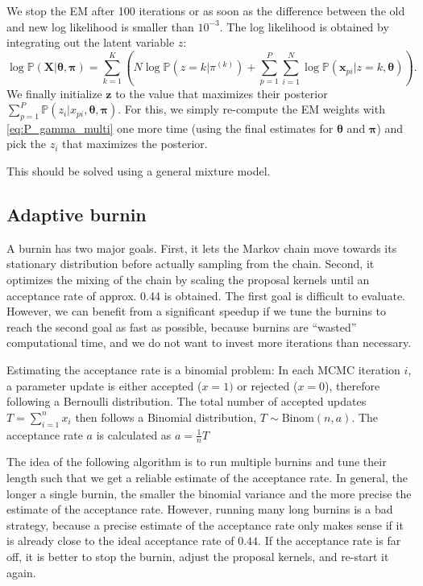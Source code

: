 \documentclass[a4paper,11pt]{article}
\def\X{\boldsymbol{X}}
\def\x{\boldsymbol{x}}
\def\z{\boldsymbol{z}}
\def\bpi{\boldsymbol{\pi}}
\def\btheta{\boldsymbol{\theta}}
\def\p{\mathbb{P}}
\begin{document}
We stop the EM after 100 iterations or as soon as the difference between the old and new log likelihood is smaller than $10^{-3}$. The log likelihood is obtained by integrating out the latent variable $z$:
\begin{equation*}
 \log \p(\X | \btheta, \bpi) = \sum_{k = 1}^K \left( N \log \p(z = k | \pi^{(k)}) + \sum_{p=1}^P\sum_{i=1}^N \log \p(\x_{pi}|z = k, \btheta) \right).
\end{equation*}
We finally initialize $\z$ to the value that maximizes their posterior $\sum_{p=1}^P \p(z_i | x_{pi}, \btheta, \bpi)$. For this, we simply re-compute the EM weights with \eqref{eq:P_gamma_multi} one more time (using the final estimates for $\btheta$ and $\bpi$) and pick the $z_i$ that maximizes the posterior.

This should be solved using a general mixture model.

\subsection{Adaptive burnin}

A burnin has two major goals. First, it lets the Markov chain move towards its stationary distribution before actually sampling from the chain. Second, it optimizes the mixing of the chain by scaling the proposal kernels until an acceptance rate of approx. 0.44 is obtained. The first goal is difficult to evaluate. However, we can benefit from a significant speedup if we tune the burnins to reach the second goal as fast as possible, because burnins are ``wasted'' computational time, and we do not want to invest more iterations than necessary.

Estimating the acceptance rate is a binomial problem: In each MCMC iteration $i$, a parameter update is either accepted ($x = 1)$ or rejected ($x = 0$), therefore following a Bernoulli distribution. The total number of accepted updates $T = \sum_{i=1}^n x_i$ then follows a Binomial distribution, $T \sim \mbox{Binom}(n, a)$. The acceptance rate $a$ is calculated as $a = \frac{1}{n} T$

The idea of the following algorithm is to run multiple burnins and tune their length such that we get a reliable estimate of the acceptance rate. In general, the longer a single burnin, the smaller the binomial variance and the more precise the estimate of the acceptance rate. However, running many long burnins is a bad strategy, because a precise estimate of the acceptance rate only makes sense if it is already close to the ideal acceptance rate of $0.44$. If the acceptance rate is far off, it is better to stop the burnin, adjust the proposal kernels, and re-start it again.
\end{document}
